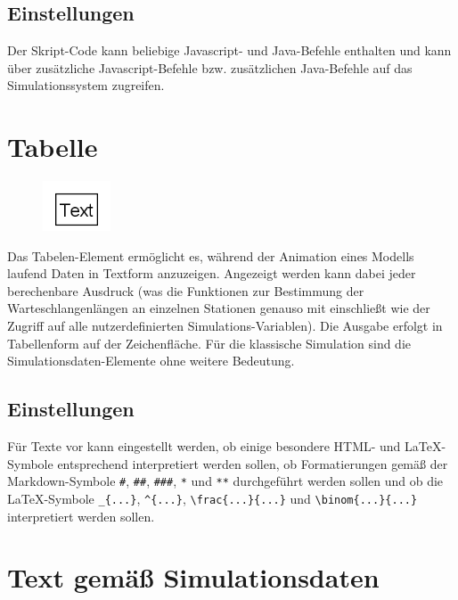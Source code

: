 \subsection*{Einstellungen}

Der Skript-Code kann beliebige Javascript- und Java-Befehle enthalten und kann über
zusätzliche Javascript-Befehle bzw. zusätzlichen Java-Befehle 
auf das Simulationssystem zugreifen.


\section{Tabelle}
\label{ref:ModelElementAnimationTable}

\begin{figure}
\vspace{-22pt}
\includegraphics[width=2cm]{imageModelElementAnimationTable.png}
\vspace{-22pt}
\end{figure}

Das Tabelen-Element ermöglicht es, während der Animation eines Modells laufend Daten in Textform anzuzeigen.
Angezeigt werden kann dabei jeder berechenbare Ausdruck (was die Funktionen zur Bestimmung der Warteschlangenlängen
an einzelnen Stationen genauso mit einschließt wie der Zugriff auf alle nutzerdefinierten Simulations-Variablen).
Die Ausgabe erfolgt in Tabellenform auf der Zeichenfläche. Für die klassische Simulation sind die Simulationsdaten-Elemente
ohne weitere Bedeutung.

\subsection*{Einstellungen}

Für Texte vor kann eingestellt werden, ob einige besondere HTML- und LaTeX-Symbole entsprechend
interpretiert werden sollen, ob Formatierungen gemäß der Markdown-Symbole \texttt{\#}, \texttt{\#\#}, \texttt{\#\#\#}, \texttt{*}
und \texttt{**} durchgeführt werden sollen und ob die LaTeX-Symbole \texttt{\_\{...\}}, \texttt{\^{}\{...\}},
\texttt{\textbackslash frac\{...\}\{...\}} und \texttt{\textbackslash binom\{...\}\{...\}} interpretiert werden sollen.


\section{Text gemäß Simulationsdaten}
\label{ref:ModelElementAnimationTextSelect}

